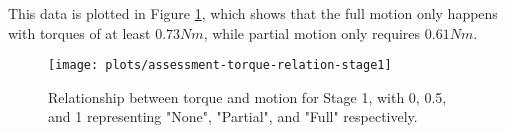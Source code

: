 This data is plotted in Figure \ref{plotassessment-torque-relation-stage1}, which shows that the full motion only happens with torques of at least $0.73 Nm$, while partial motion only requires $0.61 Nm$.

\begin{figure}[h]
	\centering
	\texttt{[image: plots/assessment-torque-relation-stage1]}
	\caption{Relationship between torque and motion for Stage 1, with 0, 0.5, and 1 representing "None", "Partial", and "Full" respectively.}
	\label{plotassessment-torque-relation-stage1}
\end{figure}


